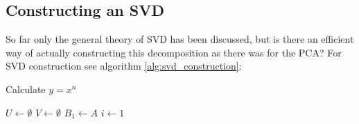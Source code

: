 \subsection{Constructing an SVD}
So far only the general theory of SVD has been discussed, but is there an efficient way of actually constructing this decomposition as there was for the PCA? For SVD construction see algorithm \ref{alg:svd_construction}:\\

\begin{algorithm}
	\caption{Calculate $y = x^n$}
	\begin{algorithmic} 
		\STATE $U \leftarrow \emptyset$
		\STATE $V \leftarrow \emptyset$
		\STATE $B_1 \leftarrow A$
		\STATE $i \leftarrow 1$
	\end{algorithmic}
\end{algorithm}